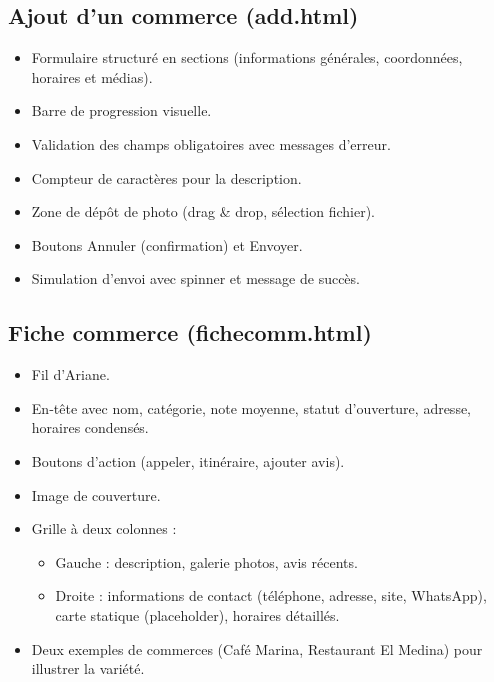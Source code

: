 \documentclass[a4paper,12pt]{article}
\begin{document}
\subsection{Ajout d’un commerce (add.html)}
\begin{itemize}
    \item Formulaire structuré en sections (informations générales, coordonnées, horaires et médias).
    \item Barre de progression visuelle.
    \item Validation des champs obligatoires avec messages d’erreur.
    \item Compteur de caractères pour la description.
    \item Zone de dépôt de photo (drag \& drop, sélection fichier).
    \item Boutons Annuler (confirmation) et Envoyer.
    \item Simulation d’envoi avec spinner et message de succès.
\end{itemize}

\subsection{Fiche commerce (fichecomm.html)}
\begin{itemize}
    \item Fil d’Ariane.
    \item En‑tête avec nom, catégorie, note moyenne, statut d’ouverture, adresse, horaires condensés.
    \item Boutons d’action (appeler, itinéraire, ajouter avis).
    \item Image de couverture.
    \item Grille à deux colonnes :
          \begin{itemize}
              \item Gauche : description, galerie photos, avis récents.
              \item Droite : informations de contact (téléphone, adresse, site, WhatsApp), carte statique (placeholder), horaires détaillés.
          \end{itemize}
    \item Deux exemples de commerces (Café Marina, Restaurant El Medina) pour illustrer la variété.
\end{itemize}
\end{document}

